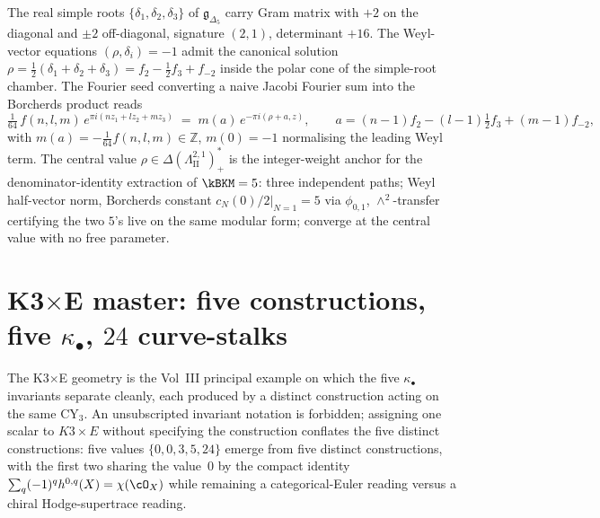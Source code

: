 \begin{remark}
\label{rem:fourier-seed-central-value}
The real simple roots $\{\delta_1, \delta_2, \delta_3\}$ of $\mathfrak{g}_{\Delta_5}$ carry Gram matrix with $+2$ on the diagonal and $\pm 2$ off-diagonal, signature $(2, 1)$, determinant $+16$. The Weyl-vector equations $(\rho, \delta_i) = -1$ admit the canonical solution $\rho = \tfrac{1}{2}(\delta_1 + \delta_2 + \delta_3) = f_2 - \tfrac{1}{2}f_3 + f_{-2}$ inside the polar cone of the simple-root chamber. The Fourier seed converting a naive Jacobi Fourier sum into the Borcherds product reads
\[
 \tfrac{1}{64}\,f(n, l, m)\,e^{\pi i(nz_1 + lz_2 + mz_3)} \;=\; m(a)\,e^{-\pi i(\rho + a, z)},\qquad a = (n-1)f_2 - (l-1)\tfrac{1}{2}f_3 + (m-1)f_{-2},
\]
with $m(a) = -\tfrac{1}{64}f(n, l, m) \in \mathbb{Z}$, $m(0) = -1$ normalising the leading Weyl term. The central value $\rho \in \Delta(\Lambda^{2, 1}_{\mathrm{II}})^*_+$ is the integer-weight anchor for the denominator-identity extraction of $\kBKM = 5$: three independent paths; Weyl half-vector norm, Borcherds constant $\left.c_N(0)/2\right|_{N=1} = 5$ via $\phi_{0, 1}$, $\wedge^2$-transfer certifying the two $5$'s live on the same modular form; converge at the central value with no free parameter.
\end{remark}

\section{K3$\times$E master: five constructions, five \texorpdfstring{$\kappa_\bullet$}{kappa-bullet}, \texorpdfstring{$24$}{24} curve-stalks}
\label{sec:k3e-master-four-constructions}

The K3$\times$E geometry is the Vol~III principal example on which the five $\kappa_\bullet$ invariants separate cleanly, each produced by a distinct construction acting on the same CY$_3$. An unsubscripted invariant notation is forbidden; assigning one scalar to \(K3\times E\) without specifying the construction conflates the five distinct constructions: five values $\{0, 0, 3, 5, 24\}$ emerge from five distinct constructions, with the first two sharing the value~$0$ by the compact identity $\sum_q (-1)^q h^{0, q}(X) = \chi(\cO_X)$ while remaining a categorical-Euler reading versus a chiral Hodge-supertrace reading.

